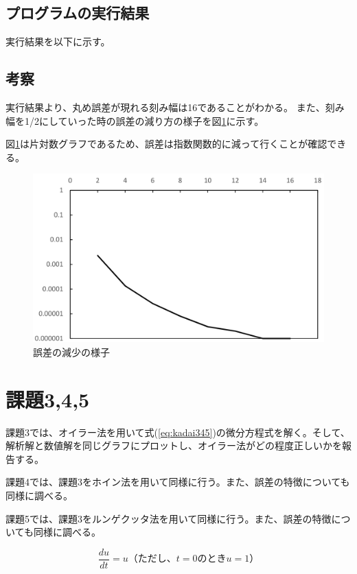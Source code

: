 \documentclass[10pt,titlepage]{jsarticle}
\begin{document}
\subsection{プログラムの実行結果}
実行結果を以下に示す。
\begin{oframed}
\end{oframed}


\subsection{考察}
実行結果より、丸め誤差が現れる刻み幅は16であることがわかる。
また、刻み幅を1/2にしていった時の誤差の減り方の様子を図\ref{fig:kadai2}に示す。

図\ref{fig:kadai2}は片対数グラフであるため、誤差は指数関数的に減って行くことが確認できる。
\begin{figure}[H]
\centering
\includegraphics[width=12cm]{img/kadai2.png}
\caption{誤差の減少の様子}
\label{fig:kadai2}
\end{figure}


\section{課題3,4,5}
課題3では、オイラー法を用いて式(\ref{eq:kadai345})の微分方程式を解く。そして、解析解と数値解を同じグラフにプロットし、オイラー法がどの程度正しいかを報告する。

課題4では、課題3をホイン法を用いて同様に行う。また、誤差の特徴についても同様に調べる。

課題5では、課題3をルンゲクッタ法を用いて同様に行う。また、誤差の特徴についても同様に調べる。

\begin{equation}
\label{eq:kadai345}
	\frac{du}{dt} = u （ただし、t=0のときu=1）
\end{equation}	
\end{document}
